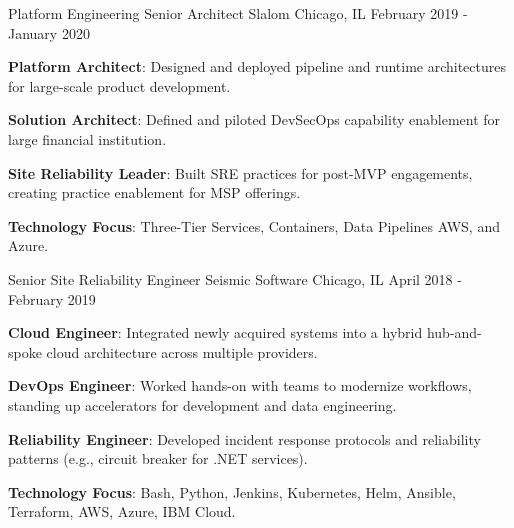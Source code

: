 \begin{cventries}
  \cventry
    {Platform Engineering Senior Architect} %
    {Slalom} %
    {Chicago, IL} %
    {February 2019 - January 2020} %
    {
      \begin{cvitems} %
        \item {\textbf{Platform Architect}: Designed and deployed pipeline and runtime architectures for large-scale product development.}
        \item {\textbf{Solution Architect}: Defined and piloted DevSecOps capability enablement for large financial institution.}
        \item {\textbf{Site Reliability Leader}: Built SRE practices for post-MVP engagements, creating practice enablement for MSP offerings.}
        \item {\textbf{Technology Focus}: Three-Tier Services, Containers, Data Pipelines AWS, and Azure.}
      \end{cvitems}
    }

  \cventry
    {Senior Site Reliability Engineer} %
    {Seismic Software} %
    {Chicago, IL} %
    {April 2018 - February 2019} %
    {
      \begin{cvitems} %
        \item {\textbf{Cloud Engineer}: Integrated newly acquired systems into a hybrid hub-and-spoke cloud architecture across multiple providers.}
        \item {\textbf{DevOps Engineer}: Worked hands-on with teams to modernize workflows, standing up accelerators for development and data engineering.}
        \item {\textbf{Reliability Engineer}: Developed incident response protocols and reliability patterns (e.g., circuit breaker for .NET services).}
        \item {\textbf{Technology Focus}: Bash, Python, Jenkins, Kubernetes, Helm, Ansible, Terraform, AWS, Azure, IBM Cloud.}
      \end{cvitems}
    }


\end{cventries}
